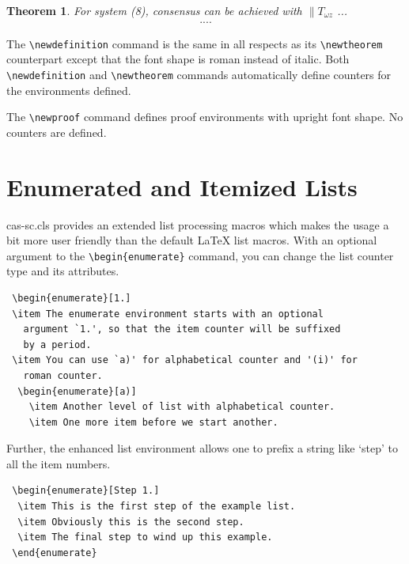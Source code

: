 \documentclass[a4paper,fleqn]{cas-sc}
\begin{document}
\newtheorem{theorem}{Theorem}

\begin{theorem}
For system (8), consensus can be achieved with 
$\|T_{\omega z}$ ...
\begin{eqnarray}\label{10}
....
\end{eqnarray}
\end{theorem}

The \verb+\newdefinition+ command is the same in
all respects as its \verb+\newtheorem+ counterpart except that
the font shape is roman instead of italic.  Both
\verb+\newdefinition+ and \verb+\newtheorem+ commands
automatically define counters for the environments defined.

The \verb+\newproof+ command defines proof environments with
upright font shape.  No counters are defined. 


\section[Enumerated ...]{Enumerated and Itemized Lists}
{cas-sc.cls} provides an extended list processing macros
which makes the usage a bit more user friendly than the default
\LaTeX{} list macros.   With an optional argument to the
\verb+\begin{enumerate}+ command, you can change the list counter
type and its attributes.

\begin{verbatim}
 \begin{enumerate}[1.]
 \item The enumerate environment starts with an optional
   argument `1.', so that the item counter will be suffixed
   by a period.
 \item You can use `a)' for alphabetical counter and '(i)' for
   roman counter.
  \begin{enumerate}[a)]
    \item Another level of list with alphabetical counter.
    \item One more item before we start another.
\end{verbatim}

Further, the enhanced list environment allows one to prefix a
string like `step' to all the item numbers.  

\begin{verbatim}
 \begin{enumerate}[Step 1.]
  \item This is the first step of the example list.
  \item Obviously this is the second step.
  \item The final step to wind up this example.
 \end{enumerate}
\end{verbatim}
\end{document}
